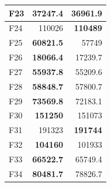 \begin{table}[]
\begin{tabular}{lrr|}
\multicolumn{1}{|l|}{\cellcolor[HTML]{FCE6AB}F23} & \multicolumn{1}{r|}{\cellcolor[HTML]{D3FFB6}\textbf{37247.4}} & 36961.9                                                   \\ \hline
\multicolumn{1}{|l|}{\cellcolor[HTML]{FCE6AB}F24} & \multicolumn{1}{r|}{110026}                                   & \cellcolor[HTML]{D3FFB6}\textbf{110489}                   \\ \hline
\multicolumn{1}{|l|}{\cellcolor[HTML]{FCE6AB}F25} & \multicolumn{1}{r|}{\cellcolor[HTML]{D3FFB6}\textbf{60821.5}} & 57749                                                     \\ \hline
\multicolumn{1}{|l|}{\cellcolor[HTML]{FCE6AB}F26} & \multicolumn{1}{r|}{\cellcolor[HTML]{D3FFB6}\textbf{18066.4}} & 17239.7                                                   \\ \hline
\multicolumn{1}{|l|}{\cellcolor[HTML]{FCE6AB}F27} & \multicolumn{1}{r|}{\cellcolor[HTML]{D3FFB6}\textbf{55937.8}} & 55209.6                                                   \\ \hline
\multicolumn{1}{|l|}{\cellcolor[HTML]{FCE6AB}F28} & \multicolumn{1}{r|}{\cellcolor[HTML]{D3FFB6}\textbf{58848.7}} & 57800.7                                                   \\ \hline
\multicolumn{1}{|l|}{\cellcolor[HTML]{FCE6AB}F29} & \multicolumn{1}{r|}{\cellcolor[HTML]{D3FFB6}\textbf{73569.8}} & 72183.1                                                   \\ \hline
\multicolumn{1}{|l|}{\cellcolor[HTML]{FCE6AB}F30} & \multicolumn{1}{r|}{\cellcolor[HTML]{D3FFB6}\textbf{151250}}  & 151073                                                    \\ \hline
\multicolumn{1}{|l|}{\cellcolor[HTML]{FCE6AB}F31} & \multicolumn{1}{r|}{191323}                                   & \cellcolor[HTML]{D3FFB6}\textbf{191744}                   \\ \hline
\multicolumn{1}{|l|}{\cellcolor[HTML]{FCE6AB}F32} & \multicolumn{1}{r|}{\cellcolor[HTML]{D3FFB6}\textbf{104160}}  & 101933                                                    \\ \hline
\multicolumn{1}{|l|}{\cellcolor[HTML]{FCE6AB}F33} & \multicolumn{1}{r|}{\cellcolor[HTML]{D3FFB6}\textbf{66522.7}} & 65749.4                                                   \\ \hline
\multicolumn{1}{|l|}{\cellcolor[HTML]{FCE6AB}F34} & \multicolumn{1}{r|}{\cellcolor[HTML]{D3FFB6}\textbf{80481.7}} & 78826.7                                                   \\ \hline

\end{tabular}
\end{table}
